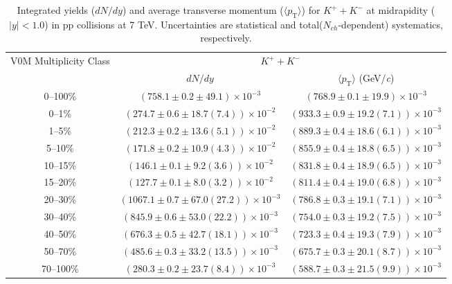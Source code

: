\begin{table}
\caption{Integrated yields ($dN/dy$) and average transverse momentum ($\langle p_{\mathrm{T}} \rangle$) for $K^{+} + K^{-}$ at midrapidity ($|y|<1.0$) in pp collisions at 7 TeV. Uncertainties are statistical and total($N_{ch}$-dependent) systematics, respectively.}
\label{tab:YieldMeanKaonSum_}
\begin{center}
\begin{tabular}{ c | c c }
\hline
\multirow{2}{*}{V0M Multiplicity Class} & \multicolumn{2}{c}{$K^{+} + K^{-}$} \\ 
& $dN/dy$ & $\langle p_{\mathrm{T}} \rangle$ (GeV/\textit{c})\\ 
\hline
0--100\% & $(758.1\pm0.2\pm49.1)\times10^{-3}$ & $(768.9\pm0.1\pm19.9)\times10^{-3}$ \\ 
0--1\% & $(274.7\pm0.6\pm18.7(7.4))\times10^{-2}$ & $(933.3\pm0.9\pm19.2(7.1))\times10^{-3}$ \\ 
1--5\% & $(212.3\pm0.2\pm13.6(5.1))\times10^{-2}$ & $(889.3\pm0.4\pm18.6(6.1))\times10^{-3}$ \\ 
5--10\% & $(171.8\pm0.2\pm10.9(4.3))\times10^{-2}$ & $(855.9\pm0.4\pm18.8(6.5))\times10^{-3}$ \\ 
10--15\% & $(146.1\pm0.1\pm9.2(3.6))\times10^{-2}$ & $(831.8\pm0.4\pm18.9(6.5))\times10^{-3}$ \\ 
15--20\% & $(127.7\pm0.1\pm8.0(3.2))\times10^{-2}$ & $(811.4\pm0.4\pm19.0(6.8))\times10^{-3}$ \\ 
20--30\% & $(1067.1\pm0.7\pm67.0(27.2))\times10^{-3}$ & $(786.8\pm0.3\pm19.1(7.1))\times10^{-3}$ \\ 
30--40\% & $(845.9\pm0.6\pm53.0(22.2))\times10^{-3}$ & $(754.0\pm0.3\pm19.2(7.5))\times10^{-3}$ \\ 
40--50\% & $(676.3\pm0.5\pm42.7(18.1))\times10^{-3}$ & $(723.3\pm0.4\pm19.3(7.9))\times10^{-3}$ \\ 
50--70\% & $(485.6\pm0.3\pm33.2(13.5))\times10^{-3}$ & $(675.7\pm0.3\pm20.1(8.7))\times10^{-3}$ \\ 
70--100\% & $(280.3\pm0.2\pm23.7(8.4))\times10^{-3}$ & $(588.7\pm0.3\pm21.5(9.9))\times10^{-3}$ \\ 
\hline
\end{tabular}
\end{center}
\end{table}
 
